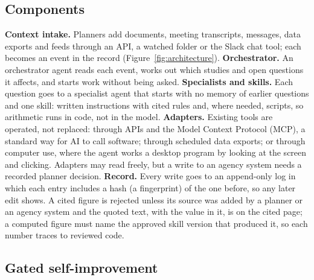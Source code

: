 \documentclass[11pt,a4paper]{article}
\begin{document}
\subsection{Components}

\textbf{Context intake.} Planners add documents, meeting transcripts, messages, data exports and feeds through an API, a watched folder or the Slack chat tool; each becomes an event in the record (Figure~\ref{fig:architecture}). \textbf{Orchestrator.} An orchestrator agent reads each event, works out which studies and open questions it affects, and starts work without being asked. \textbf{Specialists and skills.} Each question goes to a specialist agent that starts with no memory of earlier questions and one skill: written instructions with cited rules and, where needed, scripts, so arithmetic runs in code, not in the model. \textbf{Adapters.} Existing tools are operated, not replaced: through APIs and the Model Context Protocol (MCP), a standard way for AI to call software; through scheduled data exports; or through computer use, where the agent works a desktop program by looking at the screen and clicking. Adapters may read freely, but a write to an agency system needs a recorded planner decision. \textbf{Record.} Every write goes to an append-only log in which each entry includes a hash (a fingerprint) of the one before, so any later edit shows. A cited figure is rejected unless its source was added by a planner or an agency system and the quoted text, with the value in it, is on the cited page; a computed figure must name the approved skill version that produced it, so each number traces to reviewed code.

\subsection{Gated self-improvement}
\end{document}
